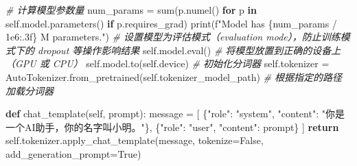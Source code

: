 \documentclass[
]{article}
\newenvironment{Shaded}{}{}
\newcommand{\BuiltInTok}[1]{\textcolor[rgb]{0.00,0.50,0.00}{#1}}
\newcommand{\CommentTok}[1]{\textcolor[rgb]{0.38,0.63,0.69}{\textit{#1}}}
\newcommand{\ControlFlowTok}[1]{\textcolor[rgb]{0.00,0.44,0.13}{\textbf{#1}}}
\newcommand{\FloatTok}[1]{\textcolor[rgb]{0.25,0.63,0.44}{#1}}
\newcommand{\KeywordTok}[1]{\textcolor[rgb]{0.00,0.44,0.13}{\textbf{#1}}}
\newcommand{\NormalTok}[1]{#1}
\newcommand{\OperatorTok}[1]{\textcolor[rgb]{0.40,0.40,0.40}{#1}}
\newcommand{\SpecialCharTok}[1]{\textcolor[rgb]{0.25,0.44,0.63}{#1}}
\newcommand{\SpecialStringTok}[1]{\textcolor[rgb]{0.73,0.40,0.53}{#1}}
\newcommand{\StringTok}[1]{\textcolor[rgb]{0.25,0.44,0.63}{#1}}
\newcommand{\VariableTok}[1]{\textcolor[rgb]{0.10,0.09,0.49}{#1}}
\begin{document}
\begin{Shaded}
\begin{Highlighting}[]
        \CommentTok{\# 计算模型参数量}
\NormalTok{        num\_params }\OperatorTok{=} \BuiltInTok{sum}\NormalTok{(p.numel() }\ControlFlowTok{for}\NormalTok{ p }\KeywordTok{in} \VariableTok{self}\NormalTok{.model.parameters() }\ControlFlowTok{if}\NormalTok{ p.requires\_grad)}
        \BuiltInTok{print}\NormalTok{(}\SpecialStringTok{f"Model has }\SpecialCharTok{\{}\NormalTok{num\_params }\OperatorTok{/} \FloatTok{1e6}\SpecialCharTok{:.3f\}}\SpecialStringTok{ M parameters."}\NormalTok{)}
        \CommentTok{\# 设置模型为评估模式（evaluation mode），防止训练模式下的 dropout 等操作影响结果}
        \VariableTok{self}\NormalTok{.model.}\BuiltInTok{eval}\NormalTok{()}
        \CommentTok{\# 将模型放置到正确的设备上（GPU 或 CPU）}
        \VariableTok{self}\NormalTok{.model.to(}\VariableTok{self}\NormalTok{.device)}
        \CommentTok{\# 初始化分词器}
        \VariableTok{self}\NormalTok{.tokenizer }\OperatorTok{=}\NormalTok{ AutoTokenizer.from\_pretrained(}\VariableTok{self}\NormalTok{.tokenizer\_model\_path)  }\CommentTok{\# 根据指定的路径加载分词器}

    \KeywordTok{def}\NormalTok{ chat\_template(}\VariableTok{self}\NormalTok{, prompt):}
\NormalTok{        message }\OperatorTok{=}\NormalTok{ [}
\NormalTok{            \{}\StringTok{"role"}\NormalTok{: }\StringTok{"system"}\NormalTok{, }\StringTok{"content"}\NormalTok{: }\StringTok{"你是一个AI助手，你的名字叫小明。"}\NormalTok{\},}
\NormalTok{            \{}\StringTok{"role"}\NormalTok{: }\StringTok{"user"}\NormalTok{, }\StringTok{"content"}\NormalTok{: prompt\}}
\NormalTok{        ]}
        \ControlFlowTok{return} \VariableTok{self}\NormalTok{.tokenizer.apply\_chat\_template(message, tokenize}\OperatorTok{=}\VariableTok{False}\NormalTok{, add\_generation\_prompt}\OperatorTok{=}\VariableTok{True}\NormalTok{)}


\end{Highlighting}
\end{Shaded}
\end{document}
